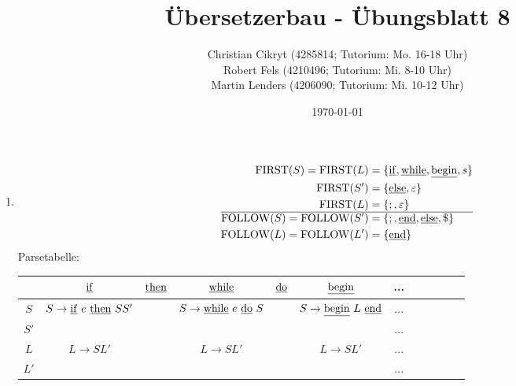 \documentclass[a4paper,10pt]{scrartcl}
\title{Übersetzerbau - Übungsblatt 8}
\author{Christian Cikryt (4285814; Tutorium: Mo. 16-18 Uhr)\\
  Robert Fels (4210496; Tutorium: Mi. 8-10 Uhr)\\
  Martin Lenders (4206090; Tutorium: Mi. 10-12 Uhr)
  }
\date{\today}
\newcommand{\FIRST}{\operatorname{FIRST}}
\newcommand{\FOLLOW}{\operatorname{FOLLOW}}
\begin{document}
\maketitle

\section{}
\begin{enumerate}
\newcommand{\IF}{\underline{\rm if}}
\newcommand{\THEN}{\underline{\rm then}}
\newcommand{\ELSE}{\underline{\rm else}}
\newcommand{\WHILE}{\underline{\rm while}}
\newcommand{\DO}{\underline{\rm do}}
\newcommand{\BEGIN}{\underline{\rm begin}}
\newcommand{\END}{\underline{\rm end}}
\newcommand{\synch}{\textbf{synch}}
\newcommand{\e}{\varepsilon}
\item   \begin{align*}
            \FIRST(S) = \FIRST(L)  &= \{\IF, \WHILE, \BEGIN, s\} \\
                        \FIRST(S') &= \{\ELSE, \varepsilon\} \\
                        \FIRST(L)  &= \{;, \varepsilon\} \\\hline
            \FOLLOW(S) = \FOLLOW(S') &= \{;, \END, \ELSE, \$\} \\
            \FOLLOW(L) = \FOLLOW(L') &= \{\END\}
        \end{align*}
        Parsetabelle:
        \begin{center}
            \begin{tabular}{c||c|c|c|c|c|c|c|c|c|c|c|}
                & $\IF$                       & $\THEN$ & $\WHILE$                  & $\DO$ & $\BEGIN$                & ... 
                \\\hline\hline
            $S$ & $S \to \IF\ e\ \THEN\ S S'$ &         & $S \to \WHILE\ e\ \DO\ S$ &       & $S \to \BEGIN\ L\ \END$ & ...
                \\\hline
            $S'$&                             &         &                           &       &                         & ...
                \\\hline 
            $L$ & $L \to SL'$                 &         & $L \to SL'$               &       & $L \to SL'$             & ...
                \\\hline
            $L'$&                             &         &                           &       &                         & ...
                \\\hline
            \end{tabular}

\end{center}
\end{enumerate}
\end{document}
